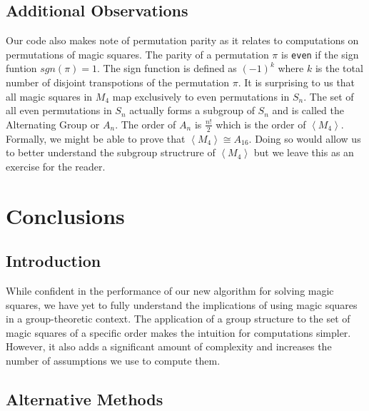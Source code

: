 \documentclass[12pt]{report}
\begin{document}
\section{Additional Observations}

\par Our code also makes note of permutation parity as it relates to computations on permutations
of magic squares. The parity of a permutation $\pi$ is \texttt{even} if the sign funtion
$sgn\left(\pi\right)=1$. The sign function is defined as ${\left(-1 \right)}^k$ where $k$ is the
total number of disjoint transpotions of the permutation $\pi$. It is surprising to us that all
magic squares in $M_4$ map exclusively to even permutations in $S_n$. The set of all even
permutations in $S_n$ actually forms a subgroup of $S_n$ and is called the Alternating Group or
$A_n$. The order of $A_n$ is $\frac{n!}{2}$ which is the order of $\left\langle M_4 \right\rangle$.
Formally, we might be able to prove that $\left\langle M_4 \right\rangle \cong A_{16}$. Doing so
would allow us to better understand the subgroup structrure of $\left\langle M_4 \right\rangle$ but
we leave this as an exercise for the reader.

\chapter{Conclusions}

\section{Introduction}

\par While confident in the performance of our new algorithm for solving magic squares, we have yet
to fully understand the implications of using magic squares in a group-theoretic context. The
application of a group structure to the set of magic squares of a specific order makes the
intuition for computations simpler. However, it also adds a significant amount of complexity and
increases the number of assumptions we use to compute them.

\section{Alternative Methods}
\end{document}

